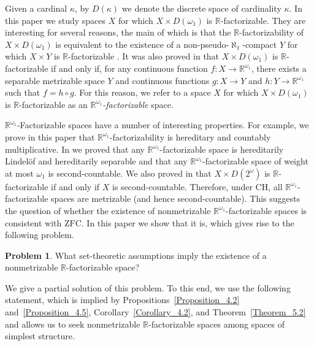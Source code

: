 \documentclass[a4paper,12pt]{amsart}
\theoremstyle{definition}
\newtheorem{problemA}{Problem}
\theoremstyle{remark}
\begin{document}
Given a cardinal $\kappa$, by $D(\kappa)$ we denote the discrete space of cardinality $\kappa$. In this paper 
we study spaces $X$ for which $X\times D(\omega_1)$ is $\mathbb R$-factorizable. They are interesting for several 
reasons, the main of which is that the $\mathbb R$-factorizability of $X\times D(\omega_1)$ is equivalent 
to the existence of a non-pseudo-$\aleph_1$-compact $Y$ for which $X\times Y$ is $\mathbb R$-factorizable 
\cite{R-S_2025}. It was also proved in \cite{R-S_2025} that $X\times D(\omega_1)$ is $\mathbb R$-factorizable if and only 
if, for any continuous function $f\colon  X\to \mathbb R^{\omega_1}$, there exists a separable metrizable space 
$Y$ and continuous functions $g\colon X\to Y$ and $h\colon Y\to \mathbb R^{\omega_1}$ such that $f=h\circ g$. For 
this reason, we refer to a space $X$ for which $X\times D(\omega_1)$ is $\mathbb R$-factorizable as an 
\emph{$\mathbb R^{\omega_1}$-factorizable} space. 

$\mathbb R^{\omega_1}$-Factorizable spaces have a number of interesting properties. For example, we prove in 
this paper that $\mathbb R^{\omega_1}$-factorizability is hereditary and countably multiplicative. In 
\cite{R-S_2025} we proved that any $\mathbb R^{\omega_1}$-factorizable space is hereditarily Lindel\"of and 
hereditarily separable and that any $\mathbb R^{\omega_1}$-factorizable space of weight at most $\omega_1$ is  
 second-countable. We also proved in \cite{R-S_2025} that $X\times D(2^\omega)$ is $\mathbb R$-factorizable 
if and only if $X$ is second-countable. Therefore, under $\mathrm{CH}$, all $\mathbb 
R^{\omega_1}$-factorizable spaces are metrizable (and hence second-countable). This suggests the question of 
whether the existence of nonmetrizable $\mathbb R^{\omega_1}$-factorizable spaces is consistent with 
$\mathrm{ZFC}$. In this paper we show that it is, which gives rise to the following problem. 

\begin{problemA}
\label{Problem_A}
What set-theoretic assumptions imply the existence of a nonmetrizable $\mathbb R$-factorizable space?
\end{problemA}

We give a partial solution of this problem. To this end, we use the following statement, which is implied by  
Propositions~\ref{Proposition_4.2} and~\ref{Proposition_4.5}, Corollary~\ref{Corollary_4.2}, and 
Theorem~\ref{Theorem_5.2} and allows us to seek 
nonmetrizable $\mathbb R$-factorizable spaces among spaces of simplest structure.
\end{document}
